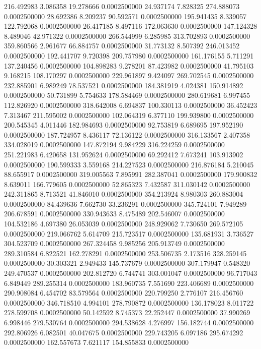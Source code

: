 216.492983 3.086358 19.278666 0.0002500000
24.937174 7.828325 274.888073 0.0002500000
28.692386 8.209237 90.592571 0.0002500000
195.941435 8.339057 122.792068 0.0002500000
26.417185 8.497116 172.063630 0.0002500000
147.124328 8.489046 42.971322 0.0002500000
266.544999 6.285985 313.702893 0.0002500000
359.860566 2.961677 66.884757 0.0002500000
31.773132 8.507392 246.013452 0.0002500000
192.441707 9.720398 209.757980 0.0002500000
161.176155 5.711291 137.240456 0.0002500000
104.898283 9.278201 87.423982 0.0002500000
41.795103 9.168215 108.170297 0.0002500000
229.961897 9.424097 269.702545 0.0002500000
232.885901 6.989249 78.537521 0.0002500000
184.381919 4.024381 150.914892 0.0002500000
50.731899 5.754633 178.584469 0.0002500000
280.619681 6.997455 112.826920 0.0002500000
318.642008 6.694837 100.330113 0.0002500000
36.452423 7.313467 211.595002 0.0002500000
102.064319 6.377110 199.939800 0.0002500000
200.545345 4.011446 182.984693 0.0002500000
92.753819 6.689695 197.952190 0.0002500000
187.724957 8.436117 72.136122 0.0002500000
316.133567 2.407358 334.028019 0.0002500000
147.872194 9.984229 316.224259 0.0002500000
251.221983 6.420658 131.952624 0.0002500000
69.292412 7.673241 103.913902 0.0002500000
190.599333 3.559168 214.227523 0.0002500000
216.876184 5.210045 88.655917 0.0002500000
319.005563 7.895991 282.387041 0.0002500000
179.900832 8.639011 166.779605 0.0002500000
52.865323 7.432587 311.030142 0.0002500000
242.311865 8.713521 41.846010 0.0002500000
354.213924 8.980303 260.883004 0.0002500000
84.439636 7.662730 33.236291 0.0002500000
345.724101 7.949289 206.678591 0.0002500000
330.943633 8.475489 202.546007 0.0002500000
104.532186 4.697380 26.053039 0.0002500000
248.929062 7.730650 269.572105 0.0002500000
219.066762 5.614709 215.723517 0.0002500000
135.681931 3.736527 304.523709 0.0002500000
267.324458 9.985256 205.913749 0.0002500000
289.310584 6.822521 162.278291 0.0002500000
253.506735 2.173516 328.259145 0.0002500000
30.303321 2.949433 145.737679 0.0002500000
307.179947 0.548320 249.470537 0.0002500000
202.812720 6.744741 303.001047 0.0002500000
96.717043 6.849449 289.255314 0.0002500000
183.960735 7.551690 223.406689 0.0002500000
290.908084 6.454702 83.579564 0.0002500000
220.799250 2.776107 216.456760 0.0002500000
346.718510 4.994101 278.790872 0.0002500000
136.178023 8.011722 278.599708 0.0002500000
50.142592 8.745373 22.252447 0.0002500000
37.990269 6.998446 279.530764 0.0002500000
294.538628 4.276997 156.182744 0.0002500000
292.806926 6.082501 40.047675 0.0002500000
229.743205 6.097186 295.674292 0.0002500000
162.557673 7.621117 154.855833 0.0002500000
